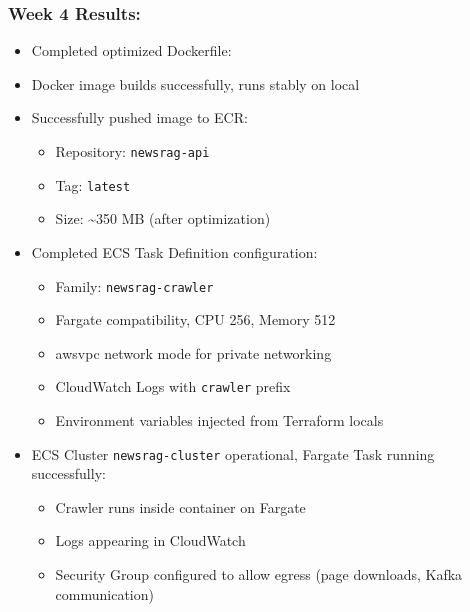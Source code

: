 \hypertarget{week-4-results}{%
\subsubsection{Week 4 Results:}}

\begin{itemize}
\item
  Completed optimized Dockerfile:

\begin{Shaded}
\begin{Highlighting}[]
 \KeywordTok{\&\&} 
  
\NormalTok{ [}\NormalTok{, }\NormalTok{, }\NormalTok{, }\NormalTok{]}
\end{Highlighting}
\end{Shaded}
\item
  Docker image builds successfully, runs stably on local
\item
  Successfully pushed image to ECR:

  \begin{itemize}
  \tightlist
  \item
    Repository: \texttt{newsrag-api}
  \item
    Tag: \texttt{latest}
  \item
    Size: \textasciitilde350 MB (after optimization)
  \end{itemize}
\item
  Completed ECS Task Definition configuration:

  \begin{itemize}
  \tightlist
  \item
    Family: \texttt{newsrag-crawler}
  \item
    Fargate compatibility, CPU 256, Memory 512
  \item
    awsvpc network mode for private networking
  \item
    CloudWatch Logs with \texttt{crawler} prefix
  \item
    Environment variables injected from Terraform locals
  \end{itemize}
\item
  ECS Cluster \texttt{newsrag-cluster} operational, Fargate Task running
  successfully:

  \begin{itemize}
  \tightlist
  \item
    Crawler runs inside container on Fargate
  \item
    Logs appearing in CloudWatch
  \item
    Security Group configured to allow egress (page downloads, Kafka
    communication)
  \end{itemize}
\end{itemize}
